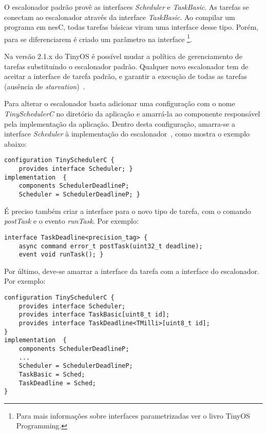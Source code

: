 \documentclass[a4paper,onecolumn, 10pt]{article}
\begin{document}
O escalonador padrão provê as interfaces \textit{Scheduler} e \textit{TaskBasic}.
As tarefas se conectam ao escalonador através da interface \textit{TaskBasic}. 
Ao compilar um programa em nesC, todas tarefas
básicas viram uma interface desse tipo. Porém, para se diferenciarem é criado um parâmetro na interface
\footnote{Para mais informações sobre interfaces parametrizadas ver o livro 
TinyOS Programming\cite[s. 8.3 e 9]{LevisGay/09}.}.

Na versão 2.1.x do TinyOS é possível mudar a política de gerenciamento de tarefas substituindo 
o escalonador padrão. Qualquer novo escalonador tem de
aceitar a interface de tarefa padrão, e garantir a execução de todas as tarefas 
(ausência de {\em starvation})~\cite{TEP106}.

Para alterar o escalonador basta adicionar uma configuração com o nome {\em TinySchedulerC} 
no diretório da aplicação e amarrá-la ao componente responsável pela implementação da aplicação. 
Dentro desta configuração, amarra-se a interface \textit{Scheduler} 
à implementação do escalonador~\cite{TEP106}, como mostra o exemplo abaixo:
\begin{lstlisting}
configuration TinySchedulerC {
    provides interface Scheduler; }
implementation  {
    components SchedulerDeadlineP;
    Scheduler = SchedulerDeadlineP; }
\end{lstlisting}

É preciso também criar a interface para o novo tipo de tarefa, com o comando \textit{postTask} e o evento
\textit{runTask}. Por exemplo:
\begin{lstlisting}
interface TaskDeadline<precision_tag> { 
    async command error_t postTask(uint32_t deadline);
    event void runTask(); }
\end{lstlisting}

Por último, deve-se amarrar a interface da tarefa com a interface do escalonador. Por exemplo:
\begin{lstlisting}
configuration TinySchedulerC {
    provides interface Scheduler;
    provides interface TaskBasic[uint8_t id];
    provides interface TaskDeadline<TMilli>[uint8_t id];
}
implementation  {
    components SchedulerDeadlineP;
    ...
    Scheduler = SchedulerDeadlineP;
    TaskBasic = Sched; 
    TaskDeadline = Sched;
}
\end{lstlisting}
\end{document}
